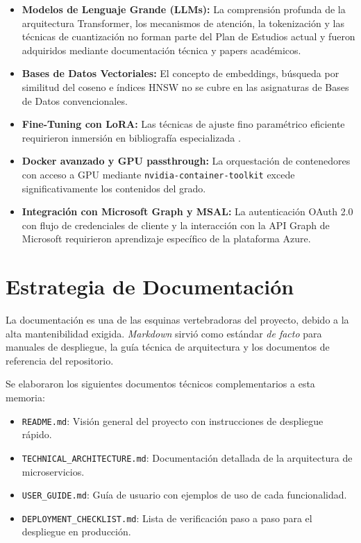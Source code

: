 \begin{itemize}
    \item \textbf{Modelos de Lenguaje Grande (LLMs):} La comprensión profunda de la arquitectura Transformer, los mecanismos de atención, la tokenización y las técnicas de cuantización no forman parte del Plan de Estudios actual y fueron adquiridos mediante documentación técnica y papers académicos.

    \item \textbf{Bases de Datos Vectoriales:} El concepto de embeddings, búsqueda por similitud del coseno e índices HNSW no se cubre en las asignaturas de Bases de Datos convencionales.

    \item \textbf{Fine-Tuning con LoRA:} Las técnicas de ajuste fino paramétrico eficiente requirieron inmersión en bibliografía especializada \cite{hu2021lora}.

    \item \textbf{Docker avanzado y GPU passthrough:} La orquestación de contenedores con acceso a GPU mediante \texttt{nvidia-container-toolkit} excede significativamente los contenidos del grado.

    \item \textbf{Integración con Microsoft Graph y MSAL:} La autenticación OAuth 2.0 con flujo de credenciales de cliente y la interacción con la API Graph de Microsoft requirieron aprendizaje específico de la plataforma Azure.
\end{itemize}

\section{Estrategia de Documentación}
La documentación es una de las esquinas vertebradoras del proyecto, debido a la alta mantenibilidad exigida. \textit{Markdown} sirvió como estándar \textit{de facto} para manuales de despliegue, la guía técnica de arquitectura y los documentos de referencia del repositorio.

Se elaboraron los siguientes documentos técnicos complementarios a esta memoria:
\begin{itemize}
    \item \texttt{README.md}: Visión general del proyecto con instrucciones de despliegue rápido.
    \item \texttt{TECHNICAL\_ARCHITECTURE.md}: Documentación detallada de la arquitectura de microservicios.
    \item \texttt{USER\_GUIDE.md}: Guía de usuario con ejemplos de uso de cada funcionalidad.
    \item \texttt{DEPLOYMENT\_CHECKLIST.md}: Lista de verificación paso a paso para el despliegue en producción.
\end{itemize}

